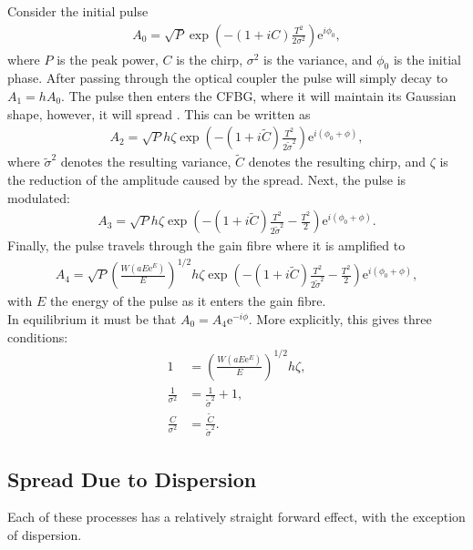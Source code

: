 Consider the initial pulse
\begin{align*}
	A_0 = \sqrt{P} \exp \left( -(1 + iC) \frac{T^2}{2 \sigma^2} \right) \textrm{e}^{i \phi_0},
\end{align*}
where $P$ is the peak power, $C$ is the chirp, $\sigma^2$ is the variance, and $\phi_0$ is the initial phase. After passing through the optical coupler the pulse will simply decay to $A_1 = h A_0$. The pulse then enters the CFBG, where it will maintain its Gaussian shape, however, it will spread \cite{agrawal2013, ferreira, silfvast}. This can be written as
\begin{align*}
A_2 = \sqrt{P} h \zeta \exp \left( -(1 + i \widetilde{C}) \frac{T^2}{2 \widetilde{\sigma}^2} \right) \textrm{e}^{i(\phi_0 + \phi)},
\end{align*}
where $\widetilde{\sigma}^2$ denotes the resulting variance, $\widetilde{C}$ denotes the resulting chirp, and $\zeta$ is the reduction of the amplitude caused by the spread. Next, the pulse is modulated:
\begin{align*}
A_3 = \sqrt{P} h \zeta \exp \left( -(1 + i \widetilde{C}) \frac{T^2}{2 \widetilde{\sigma}^2} - \frac{T^2}{2} \right) \textrm{e}^{i(\phi_0 + \phi)}.
\end{align*}
Finally, the pulse travels through the gain fibre where it is amplified to
\begin{align*}
A_4 = \sqrt{P} \left( \frac{W(a E \textrm{e}^E)}{E} \right)^{1/2} h \zeta \exp \left( -(1 + i \widetilde{C}) \frac{T^2}{2 \widetilde{\sigma}^2} - \frac{T^2}{2} \right) \textrm{e}^{i(\phi_0 + \phi)},
\end{align*}
with $E$ the energy of the pulse as it enters the gain fibre. \\

In equilibrium it must be that $A_0 = A_4 \textrm{e}^{-i \phi}$. More explicitly, this gives three conditions:
\begin{subequations}
\begin{align}
\label{eq:energycond}
1 &= \left( \frac{W(a E \textrm{e}^E)}{E} \right)^{1/2} h \zeta, \\
\label{eq:varcond}
\frac{1}{\sigma^2} &= \frac{1}{\widetilde{\sigma}^2} + 1, \\
\label{eq:chirpcond}
\frac{C}{\sigma^2} &= \frac{\widetilde{C}}{\widetilde{\sigma}^2}.
\end{align}
\label{eq:linsys}
\end{subequations}

\subsection{Spread Due to Dispersion}
Each of these processes has a relatively straight forward effect, with the exception of dispersion.



